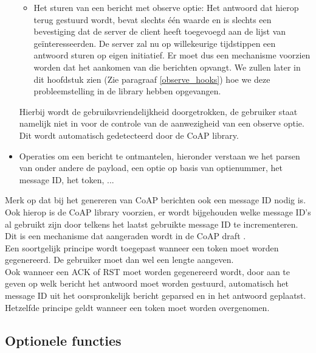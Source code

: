 \begin{itemize}
\begin{itemize}
\item Het sturen van een bericht met observe optie: Het antwoord dat hierop terug gestuurd wordt, bevat slechts \'{e}\'{e}n waarde en is slechts een bevestiging dat de server de client heeft toegevoegd aan de lijst van ge\"{i}nteresseerden. De server zal nu op willekeurige tijdstippen een antwoord sturen op eigen initiatief. Er moet dus een mechanisme voorzien worden dat het aankomen van die berichten opvangt. We zullen later in dit hoofdstuk zien (Zie paragraaf \ref{observe_hooks}) hoe we deze probleemstelling in de library hebben opgevangen.
\end{itemize}
Hierbij wordt de gebruiksvriendelijkheid doorgetrokken, de gebruiker staat namelijk niet in voor de controle van de aanwezigheid van een observe optie. Dit wordt automatisch gedetecteerd door de CoAP library.
\item Operaties om een bericht te ontmantelen, hieronder verstaan we het parsen van onder andere de payload, een optie op basis van optienummer, het message ID, het token, ...
\end{itemize}

Merk op dat bij het genereren van CoAP berichten ook een message ID nodig is. Ook hierop is de CoAP library voorzien, er wordt bijgehouden welke message ID's al gebruikt zijn door telkens het laatst gebruikte message ID te incrementeren. Dit is een mechanisme dat aangeraden wordt in de CoAP draft \cite{coapDraft}.\\
Een soortgelijk principe wordt toegepast wanneer een token moet worden gegenereerd. De gebruiker moet dan wel een lengte aangeven.\\
Ook wanneer een ACK of RST moet worden gegenereerd wordt, door aan te geven op welk bericht het antwoord moet worden gestuurd, automatisch het message ID uit het oorspronkelijk bericht geparsed en in het antwoord geplaatst. Hetzelfde principe geldt wanneer een token moet worden overgenomen.

\subsection{Optionele functies} \label{optionelefuncties}

